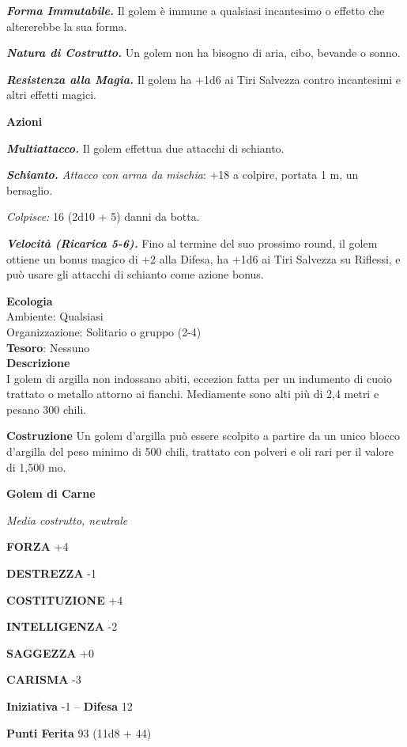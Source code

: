 \begin{multicols}{2}
	\textit{\textbf{Forma Immutabile.}} Il golem è immune a qualsiasi incantesimo o effetto che altererebbe la sua forma.

	\textit{\textbf{Natura di Costrutto.}} Un golem non ha bisogno di aria, cibo, bevande o sonno.

	\textit{\textbf{Resistenza alla Magia.}} Il golem ha +1d6 ai Tiri Salvezza contro incantesimi e altri effetti magici.

	\textbf{Azioni}

	\textit{\textbf{Multiattacco.}} Il golem effettua due attacchi di schianto.

	\textit{\textbf{Schianto.} Attacco con arma da mischia}: +18 a colpire, portata 1 m, un bersaglio.

	\textit{Colpisce:} 16 (2d10 + 5) danni da botta.

	\textit{\textbf{Velocità (Ricarica 5-6).}} Fino al termine del suo prossimo round, il golem ottiene un bonus magico di +2 alla Difesa, ha +1d6 ai Tiri Salvezza su Riflessi, e può usare gli attacchi di schianto come azione bonus.

	\textbf{Ecologia}\\
	Ambiente: Qualsiasi\\
	Organizzazione: Solitario o gruppo (2-4)\\
	\textbf{Tesoro}: Nessuno\\
	\textbf{Descrizione}\\
	I golem di argilla non indossano abiti, eccezion fatta per un indumento di cuoio trattato o metallo attorno ai fianchi. Mediamente sono alti più di 2,4 metri e pesano 300 chili.

	\textbf{Costruzione}
	Un golem d'argilla può essere scolpito a partire da un unico blocco d'argilla del peso minimo di 500 chili, trattato con polveri e oli rari per il valore di 1,500 mo.


	\medskip{}\textbf{Golem di Carne}

	\textit{Media costrutto, neutrale}

	\textbf{FORZA} +4

	\textbf{DESTREZZA} -1

	\textbf{COSTITUZIONE} +4

	\textbf{INTELLIGENZA} -2

	\textbf{SAGGEZZA} +0

	\textbf{CARISMA} -3

	\textbf{Iniziativa} -1 -- \textbf{Difesa} 12

	\textbf{Punti Ferita} 93 (11d8 + 44)


\end{multicols}
